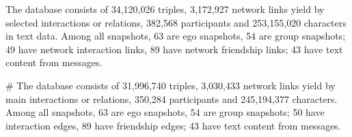 The database consists of 34,120,026 triples, 3,172,927 network links yield by selected interactions or relations, 382,568 participants and 253,155,020 characters in text data. Among all snapshots, 63 are ego snapshots, 54 are group snapshots; 49 have network interaction links, 89 have network friendship links; 43 have text content from messages.


# The database consists of 31,996,740 triples, 3,030,433 network links yield by main interactions or relations, 350,284 participants and 245,194,377 characters. Among all snapshots, 63 are ego snapshots, 54 are group snapshots; 50 have interaction edges, 89 have friendship edges; 43 have text content from messages.

